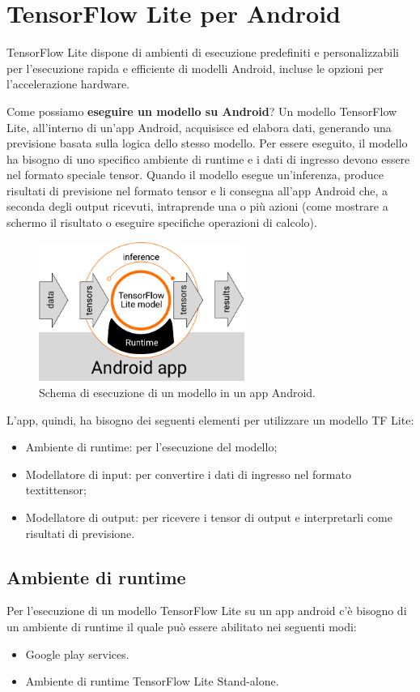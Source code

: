 \section{TensorFlow Lite per Android}
TensorFlow Lite dispone di ambienti di esecuzione predefiniti e personalizzabili per l’esecuzione rapida e efficiente di modelli Android, incluse le opzioni per l'accelerazione hardware.

Come possiamo \textbf{eseguire un modello su Android}? Un modello TensorFlow Lite, all’interno di un’app Android, acquisisce ed elabora dati, generando una previsione basata sulla logica dello stesso modello.
Per essere eseguito, il modello ha bisogno di uno specifico ambiente di runtime e i dati di ingresso devono essere nel formato speciale tensor. Quando il modello esegue un’inferenza, produce risultati di
previsione nel formato tensor e li consegna all’app Android che, a seconda degli output ricevuti, intraprende una o più azioni (come mostrare a schermo il risultato o eseguire specifiche operazioni di calcolo).

\begin{figure}[ht]
    \centering
    \includegraphics[width=0.6\textwidth]{Immagini/esecuzione.png}
    \caption{Schema di esecuzione di un modello in un app Android.}
    \label{fig:esecuzione}
\end{figure}

L’app, quindi, ha bisogno dei seguenti elementi per utilizzare un modello TF Lite:
\begin{itemize}
    \item Ambiente di runtime: per l’esecuzione del modello;
    \item Modellatore di input: per convertire i dati di ingresso nel formato textit{tensor};
    \item Modellatore di output: per ricevere i tensor di output e interpretarli come risultati di previsione.
\end{itemize}

\subsection{Ambiente di runtime}
Per l’esecuzione di un modello TensorFlow Lite su un app android c’è bisogno di un ambiente di runtime il quale può essere abilitato nei seguenti modi:
\begin{itemize}
    \item Google play services.
    \item Ambiente di runtime TensorFlow Lite Stand-alone.
\end{itemize}


